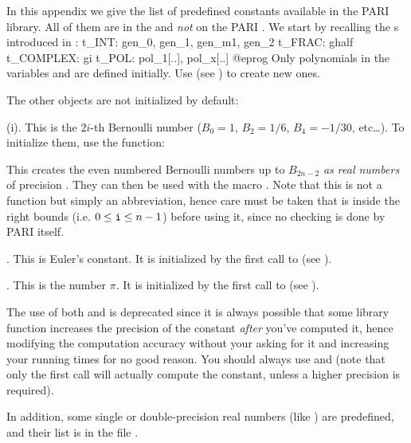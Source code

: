%
%

In this appendix we give the list of predefined constants available in the
PARI library. All of them are in the  and \emph{not} on the PARI
. We start by recalling the s introduced in
:
%
\bprog
t_INT: gen_0, gen_1, gen_m1, gen_2
t_FRAC: ghalf
t_COMPLEX: gi
t_POL: pol_1[..], pol_x[..]
@eprog
\noindent Only polynomials in the variables  and  are
defined initially. Use  (see ) to
create new ones.

\noindent The other objects are not initialized by default:

(i). This is the $2i$-th Bernoulli number ($B_0=1$, $B_2=1/6$,
$B_4=-1/30$, etc\dots). To initialize them, use the function:


This creates the even numbered Bernoulli numbers up to $B_{2n-2}$ 
\emph{as real numbers} of precision . They can then be used with
the macro . Note that this is not a function but simply an
abbreviation, hence care must be taken that  is inside the right
bounds (i.e. $0\le {\tt i}\le n-1$) before using it, since no checking is
done by PARI itself.

. This is Euler's constant. It is initialized by the first call
to  (see ).

. This is the number $\pi$.  It is initialized by the first call to
 (see ).

The use of both  and  is deprecated since it is always
possible that some library function increases the precision of the constant
\emph{after} you've computed it, hence modifying the computation accuracy
without your asking for it and increasing your running times for no good
reason. You should always use  and  (note that only
the first call will actually compute the constant, unless a higher precision
is required).

In addition, some single or double-precision real numbers (like ) are
predefined, and their list is in the file .

